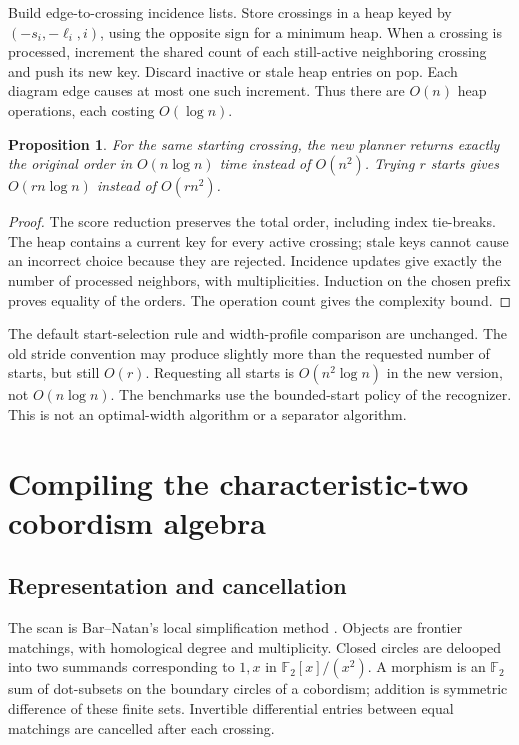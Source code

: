 \documentclass[11pt]{article}
\newtheorem{proposition}[theorem]{Proposition}
\theoremstyle{remark}\newtheorem{remark}[theorem]{Remark}
\newcommand{\F}{\mathbb F}
\begin{document}
Build edge-to-crossing incidence lists. Store crossings in a heap keyed by
$(-s_i,-\ell_i,i)$, using the opposite sign for a minimum heap. When a crossing
is processed, increment the shared count of each still-active neighboring
crossing and push its new key. Discard inactive or stale heap entries on pop.
Each diagram edge causes at most one such increment. Thus there are $O(n)$
heap operations, each costing $O(\log n)$.

\begin{proposition}
For the same starting crossing, the new planner returns exactly the original
order in $O(n\log n)$ time instead of $O(n^2)$. Trying $r$ starts gives
$O(rn\log n)$ instead of $O(rn^2)$.
\end{proposition}
\begin{proof}
The score reduction preserves the total order, including index tie-breaks.
The heap contains a current key for every active crossing; stale keys cannot
cause an incorrect choice because they are rejected. Incidence updates give
exactly the number of processed neighbors, with multiplicities. Induction on
the chosen prefix proves equality of the orders. The operation count gives
the complexity bound.
\end{proof}

The default start-selection rule and width-profile comparison are unchanged.
The old stride convention may produce slightly more than the requested number
of starts, but still $O(r)$. Requesting all starts is $O(n^2\log n)$ in the new
version, not $O(n\log n)$. The benchmarks use the bounded-start policy of the
recognizer. This is not an optimal-width algorithm or a separator algorithm.

\section{Compiling the characteristic-two cobordism algebra}
\label{sec:kernel}
\subsection{Representation and cancellation}
The scan is Bar--Natan's local simplification method \cite{BN}. Objects are
frontier matchings, with homological degree and multiplicity. Closed circles
are delooped into two summands corresponding to $1,x$ in
$\F_2[x]/(x^2)$. A morphism is an $\F_2$ sum of dot-subsets on the boundary
circles of a cobordism; addition is symmetric difference of these finite sets.
Invertible differential entries between equal matchings are cancelled after
each crossing.
\end{document}
